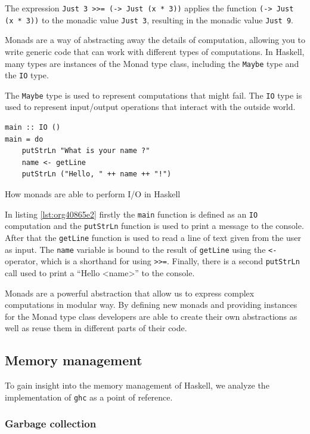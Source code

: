 \documentclass[a4paper, titlepage, twoside]{article}
\begin{document}
The expression \texttt{Just 3 >>= (\x -> Just (x * 3))} applies the function \texttt{(\x -> Just (x * 3))} to the monadic value \texttt{Just 3}, resulting in the monadic value \texttt{Just 9}.

Monads are a way of abstracting away the details of computation, allowing you to write generic code that can work with different types of computations. In Haskell, many types are instances of the Monad type class, including the \texttt{Maybe} type and the \texttt{IO} type.

The \texttt{Maybe} type is used to represent computations that might fail. The \texttt{IO} type is used to represent input/output operations that interact with the outside world.

\begin{listing}[htbp]
\begin{verbatim}
main :: IO ()
main = do
    putStrLn "What is your name ?"
    name <- getLine
    putStrLn ("Hello, " ++ name ++ "!")
\end{verbatim}
\caption{\label{lst:org40865e2}How monads are able to perform I/O in Haskell}
\end{listing}

In listing \ref{lst:org40865e2} firstly the \texttt{main} function is defined as an \texttt{IO} computation and the \texttt{putStrLn} function is used to print a message to the console. After that the \texttt{getLine} function is used to read a line of text given from the user as input. The \texttt{name} variable is bound to the result of \texttt{getLine} using the \texttt{<-} operator, which is a shorthand for using \texttt{>{}>{}=}. Finally, there is a second \texttt{putStrLn} call used to print a ``Hello <name>'' to the console.

Monads are a powerful abstraction that allow us to express complex computations in modular way. By defining new monads and providing instances for the Monad type class developers are able to create their own abstractions as well as reuse them in different parts of their code.

\subsection{Memory management}
\label{sec:org61f8fdf}

To gain insight into the memory management of Haskell, we analyze the implementation of \texttt{ghc} as a point of reference.

\subsubsection{Garbage collection}
\label{sec:orgfb09402}
\end{document}
